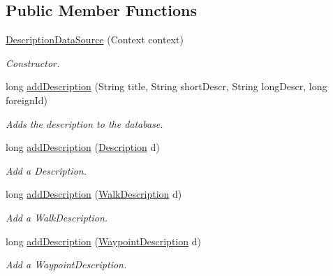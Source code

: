 \subsection*{Public Member Functions}
\begin{DoxyCompactItemize}
\item 
\hyperlink{classuk_1_1ac_1_1swan_1_1digitaltrails_1_1database_1_1_description_data_source_a38ab06958fd70330e566d3883f4bf130}{Description\+Data\+Source} (Context context)
\begin{DoxyCompactList}\small\item\em Constructor. \end{DoxyCompactList}\item 
long \hyperlink{classuk_1_1ac_1_1swan_1_1digitaltrails_1_1database_1_1_description_data_source_aefe52e0afdee53f7a300c48e19299ecc}{add\+Description} (String title, String short\+Descr, String long\+Descr, long foreign\+Id)
\begin{DoxyCompactList}\small\item\em Adds the description to the database. \end{DoxyCompactList}\item 
long \hyperlink{classuk_1_1ac_1_1swan_1_1digitaltrails_1_1database_1_1_description_data_source_a523009d78ef9c5f1144f41908da8b35e}{add\+Description} (\hyperlink{classuk_1_1ac_1_1swan_1_1digitaltrails_1_1components_1_1_description}{Description} d)
\begin{DoxyCompactList}\small\item\em Add a Description. \end{DoxyCompactList}\item 
long \hyperlink{classuk_1_1ac_1_1swan_1_1digitaltrails_1_1database_1_1_description_data_source_aed125b32a571fdd698630a23c268014e}{add\+Description} (\hyperlink{classuk_1_1ac_1_1swan_1_1digitaltrails_1_1components_1_1_walk_description}{Walk\+Description} d)
\begin{DoxyCompactList}\small\item\em Add a Walk\+Description. \end{DoxyCompactList}\item 
long \hyperlink{classuk_1_1ac_1_1swan_1_1digitaltrails_1_1database_1_1_description_data_source_a98a11820f32487aa46ae29aea11cecd2}{add\+Description} (\hyperlink{classuk_1_1ac_1_1swan_1_1digitaltrails_1_1components_1_1_waypoint_description}{Waypoint\+Description} d)
\begin{DoxyCompactList}\small\item\em Add a Waypoint\+Description. \end{DoxyCompactList}\item 

\end{DoxyCompactItemize}
